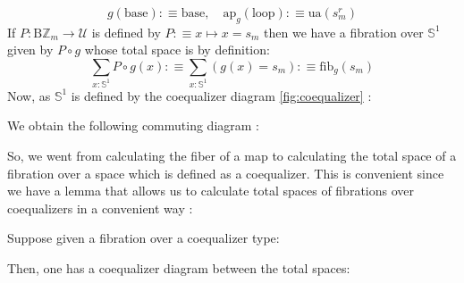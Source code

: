 \documentclass{report}
\begin{document}
$$g(\mathrm{base}) :\equiv \mathrm{base}, \quad \mathrm{ap}_g(\mathrm{loop}) :\equiv \mathrm{ua}(s_m^r)$$
If $P : \mathrm{B}\mathbb{Z}_m \rightarrow \mathcal{U}$ is defined by $P :\equiv x \mapsto  x = s_m$ then we have a fibration over $\mathbb{S}^1$ given by $P \circ g$ whose total space is by definition:
$$\sum_{x : \mathbb{S}^1} P \circ g (x) :\equiv \sum_{x : \mathbb{S}^1}(g(x)=s_m) :\equiv \mathrm{fib}_g(s_m)$$ 
Now, as $\mathbb{S}^1$ is defined by the coequalizer diagram \ref{fig:coequalizer} :
\begin{center}
\end{center}
We obtain the following commuting diagram : 
\begin{center}
\end{center}
So, we went from calculating the fiber of a map to calculating the total space of a fibration over a space which is defined as a coequalizer. This is convenient since we have a lemma that allows us to calculate total spaces of fibrations over coequalizers in a convenient way : 
\begin{prop}
  Suppose given a fibration over a coequalizer type: 
  \begin{center}
  \end{center}
  Then, one has a coequalizer diagram between the total spaces: 
  \begin{center}
  \end{center}
\end{prop}
\end{document}
